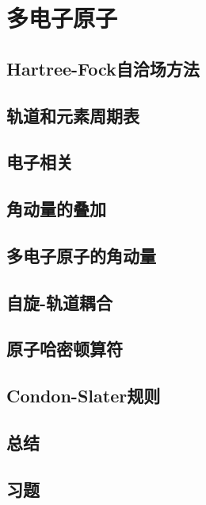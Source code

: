 \chapter{多电子原子}
\label{chap:11}
\section{Hartree-Fock自洽场方法}
\label{sec:11.1 The Hartree-Fock Self-Consistent-Field Method}

\section{轨道和元素周期表}
\label{sec:11.2 Orbitals and the Periodic Table}

\section{电子相关}
\label{sec:11.3 Electron Correlation}

\section{角动量的叠加}
\label{sec:11.4 Addition of Angular Momenta}

\section{多电子原子的角动量}
\label{sec:11.5 Angular momentum in Many-Electron Atoms}

\section{自旋-轨道耦合}
\label{sec:11.6 Spin-Orbit Interaction}

\section{原子哈密顿算符}
\label{sec:11.7 The Atomic Hamiltonian}

\section{Condon-Slater规则}
\label{sec:11.8 The Condon-Slater Rules}

\section*{总结}

\section*{习题}
